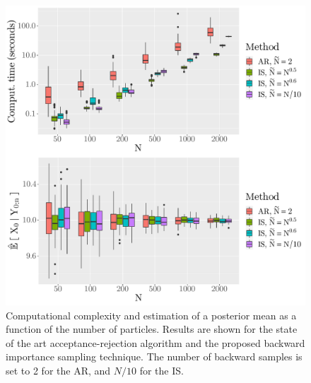 \documentclass{article}
\begin{document}
\begin{figure}[h]
\begin{center}
\includegraphics[scale = .4]{comparing_IS_AR_N_vary.pdf}
\end{center}
\caption{Computational complexity and estimation of a posterior mean as a function of the number of particles. Results are shown for the state of the art acceptance-rejection algorithm and the proposed backward  importance sampling technique. The number of backward samples is set to 2 for the AR, and $N/10$ for the IS.}
\label{fig:sine:timeandbias:N:vary}
\end{figure}
\end{document}
